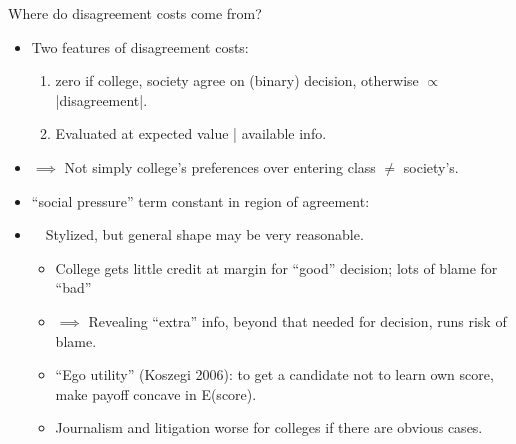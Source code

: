 \documentclass[11pt, aspectratio=169]{beamer}
\theoremstyle{plain}
\theoremstyle{plain}
\theoremstyle{plain}
\theoremstyle{plain}
\begin{document}
\begin{frame}{Where do disagreement costs come from?}
    \pause
    \begin{itemize}
        \item Two features of disagreement costs: \pause
        \begin{enumerate}
            \item zero if college, society agree on (binary) decision, otherwise $\propto$ |disagreement|. \pause
            \item Evaluated at expected value | available info. \pause
        \end{enumerate}
        \item $\implies$ Not simply college's preferences over entering class $\neq$ society's.  \pause
        \item ``social pressure'' term constant in region of agreement: \pause
        \item[] \ \ Stylized, but general shape may be very reasonable. \pause
        \begin{itemize}
            \item College gets little credit at margin for ``good'' decision; lots of blame for ``bad'' \pause
            \item $\implies$ Revealing ``extra'' info, beyond that needed for decision, runs risk of blame. \pause
            \item ``Ego utility'' (Koszegi 2006): to get a candidate not to learn own score, make payoff concave in E(score).  \pause
            \item Journalism and litigation worse for colleges if there are obvious cases.
        \end{itemize}
    \end{itemize}
\end{frame}
\end{document}
